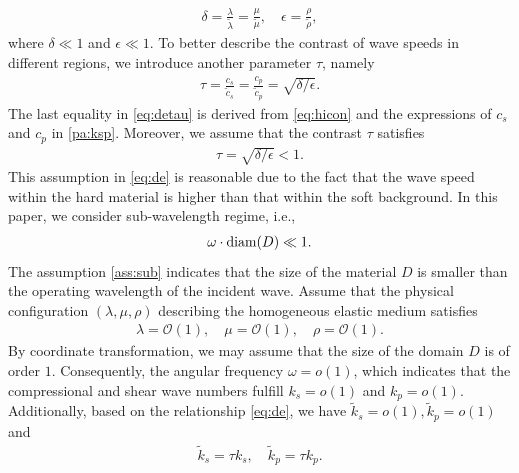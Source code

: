 \documentclass[11pt,reqno,twoside]{amsart}
\theoremstyle{definition}
\theoremstyle{remark}
\numberwithin{equation}{section}
\newcommand{\td}{\tilde}
\begin{document}
\begin{align}\label{eq:hicon}
	\delta  = \frac{\lambda}{\td{\lambda} }=\frac{\mu}{\td{\mu}}, \quad  \epsilon =\frac{\rho}{\td{\rho}} ,
\end{align}
where $\delta\ll1$ and $\epsilon\ll 1$. To better describe the contrast of wave speeds in different regions, we introduce another parameter $\tau$, namely 
\begin{align}\label{eq:detau}
	\tau = \frac{{c}_s}{\td{c}_s} = \frac{{c}_p}{\td{c}_p}= \sqrt{\delta/\epsilon}.
\end{align}
The last equality in \eqref{eq:detau} is derived from \eqref{eq:hicon} and the expressions of $c_s$ and $c_p$ in \eqref{pa:ksp}. Moreover, we assume that the contrast $\tau$ satisfies 
\begin{align}\label{eq:de}
	\tau= \sqrt{\delta/\epsilon} < 1.
\end{align}
This assumption in \eqref{eq:de} is reasonable due to the fact that the wave speed within the hard material is higher than that within the soft background.
In this paper, we consider sub-wavelength regime, i.e.,
\begin{align}\label{ass:sub}
	\omega \cdot {\rm diam} (D) \ll 1.
\end{align}
The assumption \eqref{ass:sub} indicates that the size of the material $D$ is smaller than the operating wavelength of the incident wave. Assume that the physical configuration $(\lambda, \mu, \rho)$ describing the homogeneous elastic medium satisfies
\begin{align}\label{eq:lambda=}
	\lambda=\mathcal{O}(1),\quad\mu=\mathcal{O}(1),\quad\rho=\mathcal{O}(1).
\end{align}    
By coordinate transformation, we may assume that the size of the domain $D$ is of order $1$. Consequently, the angular frequency $\omega=o(1)$, which indicates that the compressional and shear wave numbers fulfill ${k}_s =o(1)$ and ${k}_p = o(1)$. Additionally, based on the relationship \eqref{eq:de}, we have $\td{k}_s = o(1), \td{k}_p = o(1)$ and 
\begin{align}\label{eq:tdksp}
	\td{k}_s = \tau k_s, \quad \td{k}_p =  \tau k_p.
\end{align}
\end{document}
